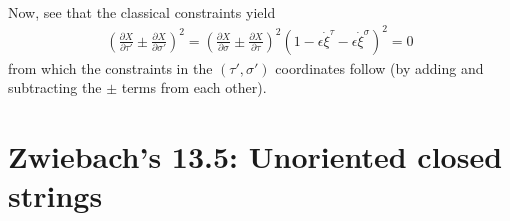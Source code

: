 \documentclass[11pt]{article}
\begin{document}
\begin{enumerate} [(a)]
\begin{align*}
    \end{align*}
    Now, see that the classical constraints yield
    \begin{align*}
        \left( \frac{\partial X}{\partial \tau '} \pm \frac{\partial X}{\partial \sigma '} \right)^2 = \left( \frac{\partial X}{\partial \sigma} \pm \frac{\partial X}{\partial \tau } \right)^2 \left( 1 - \epsilon \dot{\xi}^\tau - \epsilon \dot{\xi}^\sigma \right)^2 = 0 
    \end{align*}
    from which the constraints in the $(\tau', \sigma')$ coordinates follow (by adding and subtracting the $\pm$ terms from each other). 
\end{enumerate}




\newpage 
\section{Zwiebach's 13.5: Unoriented closed strings}
\end{document}
